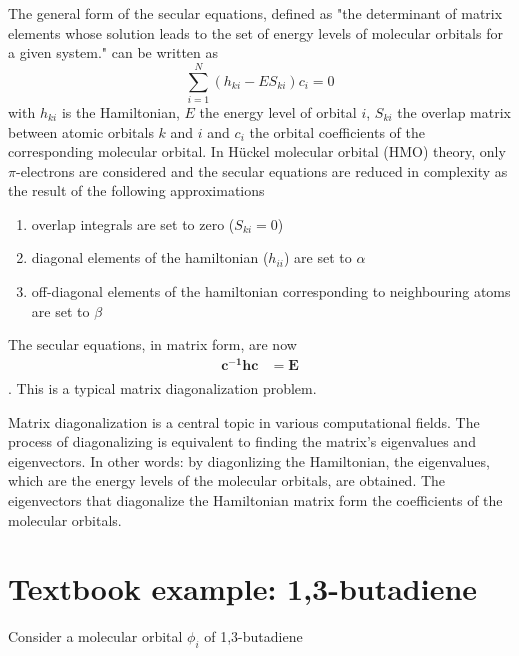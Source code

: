 \documentclass{article}
\begin{document}
The general form of the secular equations, defined as "the determinant of matrix elements whose solution leads to the set of energy levels of molecular orbitals for a given system."\cite{Minkin2009} can be written as
%
\begin{equation}
\sum_{i=1}^N(h_{ki} - {E}S_{ki})c_i = 0
\end{equation}
%
with $h_{ki}$ is the Hamiltonian, $E$ the energy level of orbital $i$, $S_{ki}$ the overlap matrix between atomic orbitals $k$ and $i$ and $c_i$ the orbital coefficients of the corresponding molecular orbital.
%
%
In H\"uckel molecular orbital (HMO) theory, only $\pi$-electrons are considered and the secular equations are reduced in complexity as the result of the following approximations
%
\begin{enumerate}
\item overlap integrals are set to zero ($S_{ki} = 0$)
\item diagonal elements of the hamiltonian ($h_{ii}$) are set to $\alpha$
\item off-diagonal elements of the hamiltonian corresponding to neighbouring atoms are set to $\beta$
\end{enumerate}
%
The secular equations, in matrix form, are now
%
\begin{equation}
\begin{split}
\boldsymbol{c^{-1}hc} &= \boldsymbol{E} \\
\end{split}
\label{eq:diagonalization}
\end{equation}.
%
This is a typical matrix diagonalization problem.

Matrix diagonalization is a central topic in various computational fields. The process of diagonalizing is equivalent to finding the matrix's eigenvalues and eigenvectors. In other words: by diagonlizing the Hamiltonian, the eigenvalues, which are the energy levels of the molecular orbitals, are obtained. The eigenvectors that diagonalize the Hamiltonian matrix form the coefficients of the molecular orbitals.

\section*{Textbook example: 1,3-butadiene}
Consider a molecular orbital $\phi_i$ of 1,3-butadiene
\end{document}
